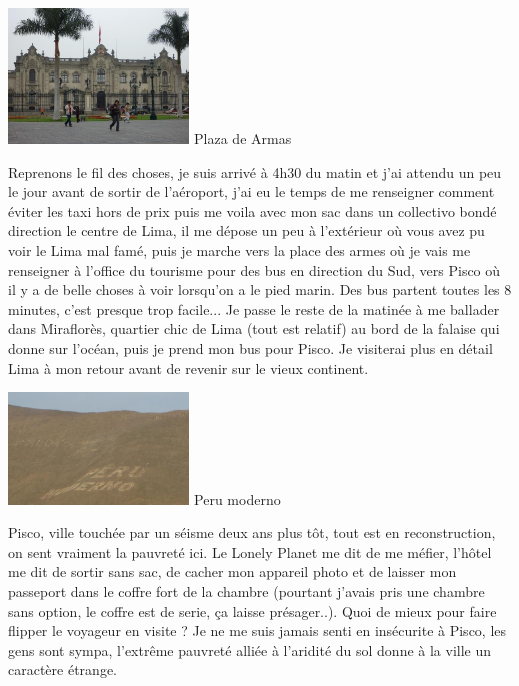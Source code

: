 \begin{multicols}{2}
\hspace*{-0.65cm}
\includegraphics[width=4.8cm]{articles/Cote-du-sud/1255996660JAoN.jpg}
Plaza de Armas


Reprenons le fil des choses, je suis arrivé à 4h30 du matin et j'ai attendu un peu le jour avant de sortir de l'aéroport, j'ai eu le temps de me renseigner comment éviter les taxi hors de prix puis me voila avec mon sac dans un collectivo bondé direction le centre de Lima, il me dépose un peu  à l'extérieur où vous avez pu voir le Lima mal famé, puis je marche vers la place des armes où je vais me renseigner à l'office du tourisme pour des bus en direction du Sud, vers Pisco où il y a de belle choses à voir lorsqu'on a le pied marin. Des bus partent toutes les 8 minutes, c'est presque trop facile... Je passe le reste de la matinée à me ballader dans Miraflorès, quartier chic de Lima (tout est relatif) au bord de la falaise qui donne sur l'océan, puis je prend mon bus pour Pisco. Je visiterai plus en détail Lima à mon retour avant de revenir sur le vieux continent.

\hspace*{-0.65cm}
\includegraphics[width=4.8cm]{articles/Cote-du-sud/1255996643RUpx.jpg}
Peru moderno


Pisco, ville touchée par un séisme deux ans plus tôt, tout est en reconstruction, on sent vraiment la pauvreté ici. Le Lonely Planet me dit de me méfier, l'hôtel me dit de sortir sans sac, de cacher mon appareil photo et de laisser mon passeport dans le coffre fort de la chambre (pourtant j'avais pris une chambre sans option, le coffre est de serie, ça laisse présager..). Quoi de mieux pour faire flipper le voyageur en visite ? Je ne me suis jamais senti en insécurite à Pisco, les gens sont sympa, l'extrême pauvreté alliée à l'aridité du sol donne à la ville un caractère étrange.


\end{multicols}
